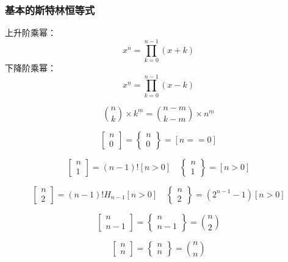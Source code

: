 \subsubsection{基本的斯特林恒等式}
\begin{definition}
  上升阶乘幂：
  $$
  x^{\overline{n}}=\prod_{k=0}^{n-1} (x+k)
  $$
  下降阶乘幂：
  $$
  x^{\underline{n}}=\prod_{k=0}^{n-1} (x-k)
  $$
\end{definition}

\begin{proposition}
  $$
  \binom{n}{k} \times k^{\underline{m}}= \binom{n-m}{k-m} \times n^{\underline{m}}
  $$
\end{proposition}

$$
\begin{bmatrix}
  n \\ 0
\end{bmatrix}= 
\begin{Bmatrix}
  n \\ 0
\end{Bmatrix}=[n==0]
$$

$$
\begin{bmatrix}
  n \\ 1
\end{bmatrix}= (n-1)![n>0]
\quad 
\begin{Bmatrix}
  n \\ 1
\end{Bmatrix}= [n>0]
$$

$$
\begin{bmatrix}
  n \\ 2
\end{bmatrix}= (n-1)!H_{n-1}[n>0]
\quad 
\begin{Bmatrix}
  n \\ 2
\end{Bmatrix}=(2^{n-1}-1) [n>0]
$$

$$
\begin{bmatrix}
  n \\ n-1
\end{bmatrix}= 
\begin{Bmatrix}
  n \\ n-1 
\end{Bmatrix}= \binom{n}{2}
$$

$$
\begin{bmatrix}
  n \\ n
\end{bmatrix}= 
\begin{Bmatrix}
  n \\ n
\end{Bmatrix}= \binom{n}{n}
$$


